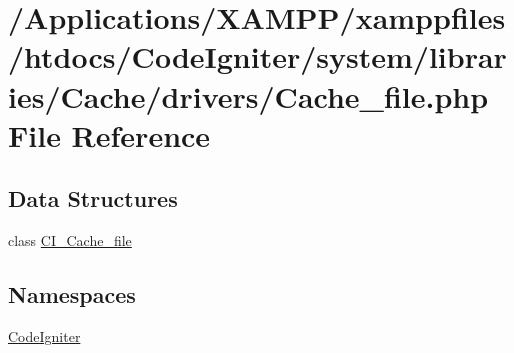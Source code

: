 \hypertarget{_cache__file_8php}{}\section{/\+Applications/\+X\+A\+M\+P\+P/xamppfiles/htdocs/\+Code\+Igniter/system/libraries/\+Cache/drivers/\+Cache\+\_\+file.php File Reference}
\label{_cache__file_8php}
\subsection*{Data Structures}
\begin{DoxyCompactItemize}
\item 
class \mbox{\hyperlink{class_c_i___cache__file}{C\+I\+\_\+\+Cache\+\_\+file}}
\end{DoxyCompactItemize}
\subsection*{Namespaces}
\begin{DoxyCompactItemize}
\item 
 \mbox{\hyperlink{namespace_code_igniter}{Code\+Igniter}}
\end{DoxyCompactItemize}
